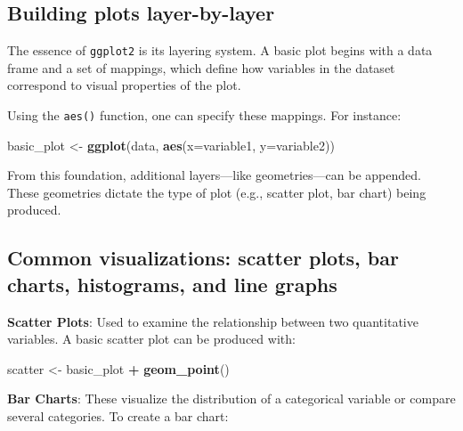 \documentclass[
  b5paper]{book}
\newenvironment{Shaded}{\begin{snugshade}}{\end{snugshade}}
\newcommand{\AttributeTok}[1]{\textcolor[rgb]{0.13,0.29,0.53}{#1}}
\newcommand{\FunctionTok}[1]{\textcolor[rgb]{0.13,0.29,0.53}{\textbf{#1}}}
\newcommand{\NormalTok}[1]{#1}
\newcommand{\OtherTok}[1]{\textcolor[rgb]{0.56,0.35,0.01}{#1}}
\newcommand{\SpecialCharTok}[1]{\textcolor[rgb]{0.81,0.36,0.00}{\textbf{#1}}}
\begin{document}
\hypertarget{building-plots-layer-by-layer}{%
\subsection*{Building plots layer-by-layer}\label{building-plots-layer-by-layer}}

The essence of \texttt{ggplot2} is its layering system. A basic plot begins with a data frame and a set of mappings, which define how variables in the dataset correspond to visual properties of the plot.

Using the \texttt{aes()} function, one can specify these mappings. For instance:

\begin{Shaded}
\begin{Highlighting}[]
\NormalTok{basic\_plot }\OtherTok{\textless{}{-}} \FunctionTok{ggplot}\NormalTok{(data, }\FunctionTok{aes}\NormalTok{(}\AttributeTok{x=}\NormalTok{variable1, }\AttributeTok{y=}\NormalTok{variable2))}
\end{Highlighting}
\end{Shaded}

From this foundation, additional layers---like geometries---can be appended. These geometries dictate the type of plot (e.g., scatter plot, bar chart) being produced.

\hypertarget{common-visualizations-scatter-plots-bar-charts-histograms-and-line-graphs}{%
\subsection*{Common visualizations: scatter plots, bar charts, histograms, and line graphs}\label{common-visualizations-scatter-plots-bar-charts-histograms-and-line-graphs}}

\textbf{Scatter Plots}: Used to examine the relationship between two quantitative variables. A basic scatter plot can be produced with:

\begin{Shaded}
\begin{Highlighting}[]
\NormalTok{scatter }\OtherTok{\textless{}{-}}\NormalTok{ basic\_plot }\SpecialCharTok{+} \FunctionTok{geom\_point}\NormalTok{()}
\end{Highlighting}
\end{Shaded}

\textbf{Bar Charts}: These visualize the distribution of a categorical variable or compare several categories. To create a bar chart:
\end{document}
